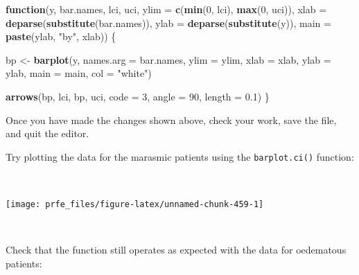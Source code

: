 \documentclass[12pt,a4paper]{book}
\newenvironment{Shaded}{\begin{snugshade}}{\end{snugshade}}
\newcommand{\ControlFlowTok}[1]{\textcolor[rgb]{0.13,0.29,0.53}{\textbf{#1}}}
\newcommand{\DataTypeTok}[1]{\textcolor[rgb]{0.13,0.29,0.53}{#1}}
\newcommand{\DecValTok}[1]{\textcolor[rgb]{0.00,0.00,0.81}{#1}}
\newcommand{\FloatTok}[1]{\textcolor[rgb]{0.00,0.00,0.81}{#1}}
\newcommand{\KeywordTok}[1]{\textcolor[rgb]{0.13,0.29,0.53}{\textbf{#1}}}
\newcommand{\NormalTok}[1]{#1}
\newcommand{\OperatorTok}[1]{\textcolor[rgb]{0.81,0.36,0.00}{\textbf{#1}}}
\newcommand{\StringTok}[1]{\textcolor[rgb]{0.31,0.60,0.02}{#1}}
\theoremstyle{definition}
\theoremstyle{definition}
\theoremstyle{definition}
\theoremstyle{remark}
\begin{document}
\begin{Shaded}
\begin{Highlighting}[]
\ControlFlowTok{function}\NormalTok{(y, bar.names, lci, uci,}
         \DataTypeTok{ylim =} \KeywordTok{c}\NormalTok{(}\KeywordTok{min}\NormalTok{(}\DecValTok{0}\NormalTok{, lci), }\KeywordTok{max}\NormalTok{(}\DecValTok{0}\NormalTok{, uci)),}
         \DataTypeTok{xlab =} \KeywordTok{deparse}\NormalTok{(}\KeywordTok{substitute}\NormalTok{(bar.names)),}
         \DataTypeTok{ylab =} \KeywordTok{deparse}\NormalTok{(}\KeywordTok{substitute}\NormalTok{(y)),}
         \DataTypeTok{main =} \KeywordTok{paste}\NormalTok{(ylab, }\StringTok{"by"}\NormalTok{, xlab)) \{}

\NormalTok{  bp <-}\StringTok{ }\KeywordTok{barplot}\NormalTok{(y, }\DataTypeTok{names.arg =}\NormalTok{ bar.names,  }\DataTypeTok{ylim =}\NormalTok{ ylim, }\DataTypeTok{xlab =}\NormalTok{ xlab,}
                \DataTypeTok{ylab =}\NormalTok{ ylab, }\DataTypeTok{main =}\NormalTok{ main, }\DataTypeTok{col =} \StringTok{"white"}\NormalTok{)}
     
  \KeywordTok{arrows}\NormalTok{(bp, lci, bp, uci, }\DataTypeTok{code =} \DecValTok{3}\NormalTok{, }\DataTypeTok{angle =} \DecValTok{90}\NormalTok{, }\DataTypeTok{length =} \FloatTok{0.1}\NormalTok{)}
\NormalTok{\}}
\end{Highlighting}
\end{Shaded}

\newpage

Once you have made the changes shown above, check your work, save the
file, and quit the editor.

Try plotting the data for the marasmic patients using the
\texttt{barplot.ci()} function:

~

\begin{Shaded}
\end{Shaded}

\begin{center}\texttt{[image: prfe\_files/figure-latex/unnamed-chunk-459-1]} \end{center}

~

Check that the function still operates as expected with the data for
oedematous patients:
\end{document}
